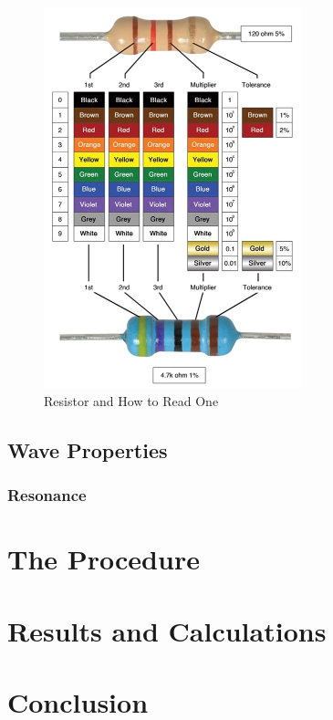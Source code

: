 \documentclass[12pt]{article}
\begin{document}
\begin{figure}[ht]
    \centering
    \includegraphics[width=7.5cm]{resistorr.jpg}
    \caption{\centering Resistor and How to Read One \protect\cite{resistorpic}}
    \label{fig:resistor}
\end{figure}

\subsection{Wave Properties}




\subsubsection{Resonance}






\section{The Procedure}



\section{Results and Calculations}



\section{Conclusion}
\end{document}

